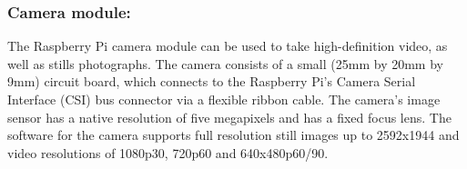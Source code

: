 \documentclass[14pt]{extarticle}
\begin{document}
\subsubsection{Camera module:}
{\quad}The Raspberry Pi camera module can be used to take high-definition video, as well as stills photographs. The camera consists of a small (25mm by 20mm by 9mm) circuit board, which connects to the Raspberry Pi's Camera Serial Interface (CSI) bus connector via a flexible ribbon cable. The camera's image sensor has a native resolution of five megapixels and has a fixed focus lens. The software for the camera supports full resolution still images up to 2592x1944 and video resolutions of 1080p30, 720p60 and 640x480p60/90.
\end{document}
